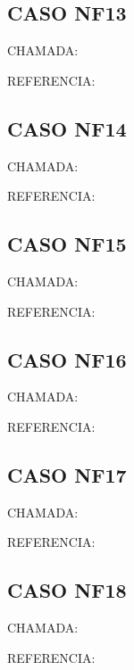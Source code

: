 \documentclass{undftex}
\begin{document}
\begin{refsection}\section*{CASO NF13}\noindent CHAMADA: \par\noindent REFERENCIA:\par\printbibliography[heading=none]\end{refsection}\clearpage
\begin{refsection}\section*{CASO NF14}\noindent CHAMADA: \par\noindent REFERENCIA:\par\printbibliography[heading=none]\end{refsection}\clearpage
\begin{refsection}\section*{CASO NF15}\noindent CHAMADA: \par\noindent REFERENCIA:\par\printbibliography[heading=none]\end{refsection}\clearpage
\begin{refsection}\section*{CASO NF16}\noindent CHAMADA: \par\noindent REFERENCIA:\par\printbibliography[heading=none]\end{refsection}\clearpage
\begin{refsection}\section*{CASO NF17}\noindent CHAMADA: \par\noindent REFERENCIA:\par\printbibliography[heading=none]\end{refsection}\clearpage
\begin{refsection}\section*{CASO NF18}\noindent CHAMADA: \par\noindent REFERENCIA:\par\printbibliography[heading=none]\end{refsection}\clearpage
\end{document}
